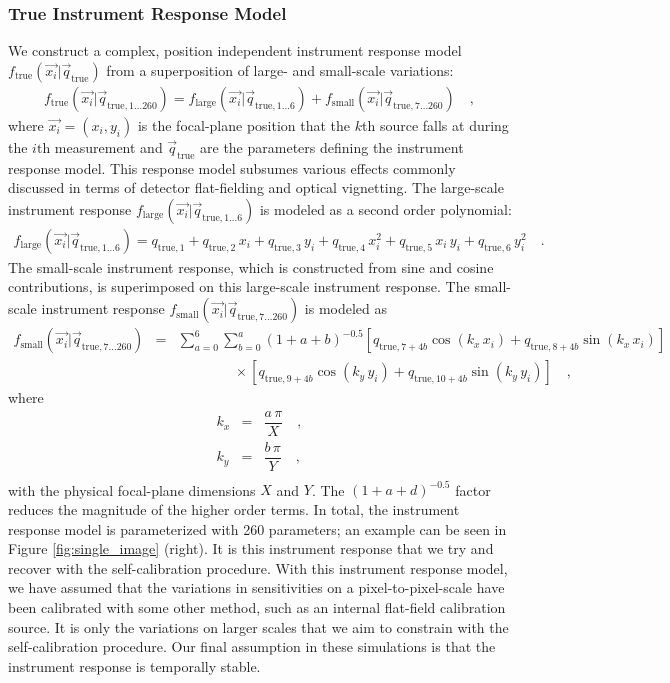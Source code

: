 \documentclass[preprint,pdftex]{aastex}
\newcommand{\true}{\text{true}}
\begin{document}
\subsubsection{True Instrument Response Model}
\label{sec:instrument_response_model}
We construct a complex, position independent instrument response model $f_\true(\vec{x_i} | \vec{q}_{\true})$ from a superposition of large- and small-scale variations:
\begin{eqnarray*}
f_\true(\vec{x_i} | \vec{q}_{\true, 1 \ldots 260}) = f_\text{large}(\vec{x_i} | \vec{q}_{\true, 1 \ldots 6}) + f_\text{small}(\vec{x_i} | \vec{q}_{\true, 7 \ldots 260}) \quad ,
\end{eqnarray*}
where $\vec{x_i} = (x_i, y_i)$ is the focal-plane position that the $k$th source falls at during the $i\text{th}$ measurement and $\vec{q}_\true$ are the parameters defining the instrument response model. This response model subsumes various effects commonly discussed in terms of detector flat-fielding and optical vignetting. The large-scale instrument response $f_\text{large}(\vec{x_i} | \vec{q}_{\true, 1 \ldots 6})$ is modeled as a second order polynomial:
\begin{eqnarray*}
f_\text{large}(\vec{x_i} | \vec{q}_{\true, 1 \ldots 6}) = q_{\true, 1} + q_{\true, 2} \, x_i + q_{\true, 3} \, y_i + q_{\true, 4} \, x_i^2 + q_{\true, 5} \, x_i \, y_i  + q_{\true, 6} \, y_i^2  \quad .
\end{eqnarray*}
The small-scale instrument response, which is constructed from sine and cosine contributions, is superimposed on this large-scale instrument response. The small-scale instrument response $f_\text{small}(\vec{x_i} | \vec{q}_{\true, 7 \ldots 260})$ is modeled as
\begin{eqnarray*}
f_\text{small}(\vec{x_i} | \vec{q}_{\true, 7\ldots 260})  & = &  \sum_{a=0}^6 \sum_{b=0}^a \left(1 + a + b\right) ^ {-0.5} \left[ q_{\true, 7+4b} \cos (k_x \, x_i) + q_{\true, 8+4b} \sin (k_x \, x_i) \right] \\
& & \qquad \qquad \times \left[ q_{\true, 9+4b} \cos (k_y \, y_i) + q_{\true, 10+4b} \sin (k_y \, y_i) \right] \quad ,
\end{eqnarray*}
where
\begin{eqnarray*}
k_x & = & \dfrac{a \, \pi}{X} \quad ,\\
k_y & = & \dfrac{b \, \pi}{Y} \quad ,\\
\end{eqnarray*}
with the physical focal-plane dimensions $X$ and $Y$. The $(1 + a +d)^{-0.5}$ factor reduces the magnitude of the higher order terms. In total, the instrument response model is parameterized with 260 parameters; an example can be seen in Figure \ref{fig:single_image} (right). It is this instrument response that we try and recover with the self-calibration procedure. With this instrument response model, we have assumed that the variations in sensitivities on a pixel-to-pixel-scale have been calibrated with some other method, such as an internal flat-field calibration source. It is only the variations on larger scales that we aim to constrain with the self-calibration procedure. Our final assumption in these simulations is that the instrument response is temporally stable. 
\end{document}
